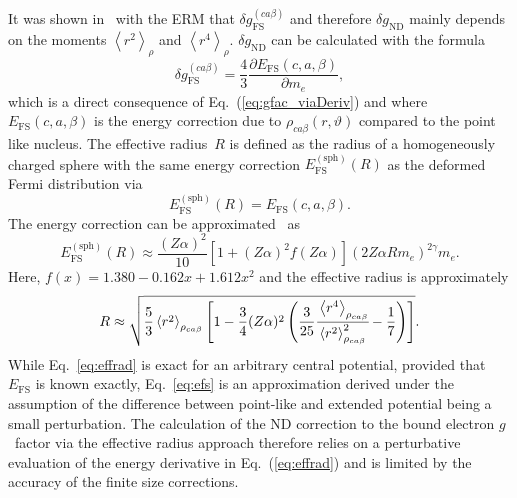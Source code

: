 It was shown in~\cite{jacek2012} with the ERM \cite{Shabaev1993} that $\delta g_{\text{FS}}^{(ca\beta)}$ and therefore $\delta g_{\text{ND}}$ mainly depends on the moments $\left< r^2 \right>_{\rho}$ and $\left< r^4 \right>_{\rho}$. $\delta g_{\text{ND}}$ can be calculated with the formula~\cite{Karshenboim2005}
\begin{equation}
\delta g^{(ca\beta)}_{\text{FS}}=\frac{4}{3}\frac{\partial E_{\text{FS}}(c,a,\beta)}{\partial m_e},
\label{eq:effrad}
\end{equation}
which is a direct consequence of Eq.~(\ref{eq:gfac_viaDeriv}) and where $E_{\text{FS}}(c,a,\beta)$ is the energy correction due to $\rho_{ca\beta}(r,\vartheta)$ compared to the point like nucleus.
The effective radius~$R$ is defined as the radius of a homogeneously charged sphere with the same energy correction $E^{(\text{sph})}_{\text{FS}}(R)$ as the deformed Fermi distribution via
\begin{equation}
E^{(\text{sph})}_{\text{FS}}(R) = E_{\text{FS}}(c,a,\beta).
\label{eq:effradNum}
\end{equation}
The energy correction can be approximated~\cite{Shabaev1993} as
\begin{equation}
E^{(\text{sph})}_{\text{FS}}(R)\approx\frac{(Z\alpha)^2}{10}\left[{1}{+}(Z\alpha)^2f(Z\alpha) \right](2Z\alpha R m_e)^{2\gamma}m_e.
\label{eq:efs}
\end{equation}
Here, $f(x)=1.380-0.162x+1.612x^2$ and the effective radius is approximately
\small
\begin{equation}
R\approx\sqrt{\frac{5}{3}\left<r^2\right>_{\rho_{ca\beta}}\left[ 1-\frac{3}{4}(Z\alpha)^2 \left( \frac{3}{25}\cfrac{\left<r^4\right>_{\rho_{ca\beta}}}{\left<r^2\right>^2_{\rho_{ca\beta}}}-\frac{1}{7} \right) \right]}.
\label{eq:radius}
\end{equation}
\normalsize
While Eq.~\eqref{eq:effrad} is exact for an arbitrary central potential, provided that $E_{\text{FS}}$ is known exactly, Eq.~\eqref{eq:efs} is an approximation derived under the assumption of the difference between point-like and extended potential being a small perturbation. The calculation of the ND correction to the bound electron $g$~factor via the effective radius approach therefore relies on a perturbative evaluation of the energy derivative in Eq.~(\ref{eq:effrad}) and is limited by the accuracy of the finite size corrections.


